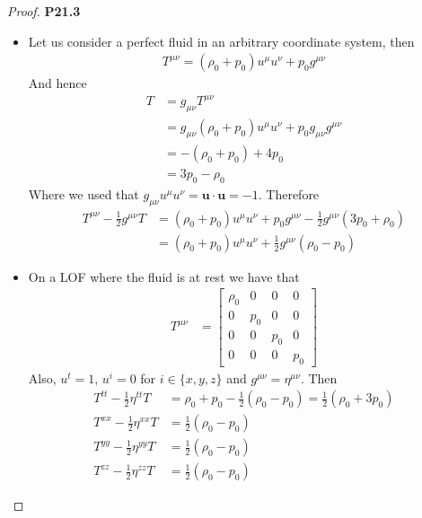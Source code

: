 \documentclass[11pt]{article}
\theoremstyle{definition}
\begin{document}
\cleardoublepage
\begin{proof}{\textbf{P21.3}}
\begin{itemize}
\item [\textbf{a.}] Let us consider a perfect fluid in an arbitrary coordinate
system, then
\begin{align*}
    T^{\mu\nu} = (\rho_0 + p_0)u^\mu u^\nu + p_0 g^{\mu\nu}
\end{align*}
And hence
\begin{align*}
    T &= g_{\mu\nu} T^{\mu\nu} \\
    &= g_{\mu\nu}(\rho_0 + p_0)u^\mu u^\nu + p_0 g_{\mu\nu}g^{\mu\nu} \\
    &= -(\rho_0 + p_0) + 4p_0 \\
    &= 3p_0 - \rho_0
\end{align*}
Where we used that $g_{\mu\nu} u^\mu u^\nu = \bm{u}\cdot\bm{u} = -1$.
Therefore
\begin{align*}
    T^{\mu\nu} - \frac{1}{2}g^{\mu\nu}T
    &= (\rho_0 + p_0)u^\mu u^\nu + p_0 g^{\mu\nu} 
    - \frac{1}{2}g^{\mu\nu}(3p_0 + \rho_0) \\
    &= (\rho_0 + p_0)u^\mu u^\nu
    + \frac{1}{2}g^{\mu\nu}(\rho_0 - p_0)
\end{align*}
\item [\textbf{b.}]
On a LOF where the fluid is at rest we have that
\begin{align*}
    T^{\mu\nu}
    &= \begin{bmatrix}
        \rho_0 & 0 & 0 & 0 \\
        0 & p_0 & 0 & 0 \\
        0 & 0 & p_0 & 0 \\
        0 & 0 & 0 & p_0
    \end{bmatrix}
\end{align*}
Also, $u^t = 1$, $u^i = 0$ for $i \in \{x,y,z\}$ and
$g^{\mu\nu} = \eta^{\mu\nu}$. Then
\begin{align*}
    T^{tt} - \frac{1}{2}\eta^{tt}T
    &= \rho_0 + p_0
    - \frac{1}{2}(\rho_0 - p_0)
    = \frac{1}{2}(\rho_0 + 3p_0) \\
    T^{xx} - \frac{1}{2}\eta^{xx}T
    &= \frac{1}{2}(\rho_0 - p_0) \\
    T^{yy} - \frac{1}{2}\eta^{yy}T
    &= \frac{1}{2}(\rho_0 - p_0) \\
    T^{zz} - \frac{1}{2}\eta^{zz}T
    &= \frac{1}{2}(\rho_0 - p_0)
\end{align*}
\end{itemize}
\end{proof}
\end{document}
